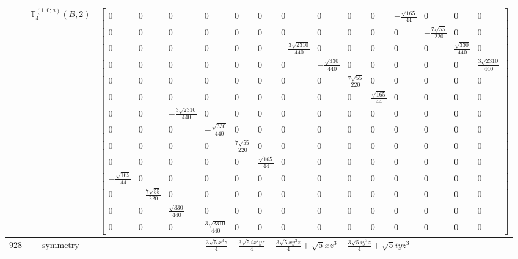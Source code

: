 \documentclass[fleqn,8pt,landscape]{jsarticle}
\begin{document}
\begin{longtable}{ccc}
$  $ & $ \mathbb{T}_{4}^{(1,0;a)}(B,2) $ & $ \begin{bmatrix} 0 & 0 & 0 & 0 & 0 & 0 & 0 & 0 & 0 & 0 & - \frac{\sqrt{165}}{44} & 0 & 0 & 0 \\ 0 & 0 & 0 & 0 & 0 & 0 & 0 & 0 & 0 & 0 & 0 & - \frac{7 \sqrt{55}}{220} & 0 & 0 \\ 0 & 0 & 0 & 0 & 0 & 0 & - \frac{3 \sqrt{2310}}{440} & 0 & 0 & 0 & 0 & 0 & \frac{\sqrt{330}}{440} & 0 \\ 0 & 0 & 0 & 0 & 0 & 0 & 0 & - \frac{\sqrt{330}}{440} & 0 & 0 & 0 & 0 & 0 & \frac{3 \sqrt{2310}}{440} \\ 0 & 0 & 0 & 0 & 0 & 0 & 0 & 0 & \frac{7 \sqrt{55}}{220} & 0 & 0 & 0 & 0 & 0 \\ 0 & 0 & 0 & 0 & 0 & 0 & 0 & 0 & 0 & \frac{\sqrt{165}}{44} & 0 & 0 & 0 & 0 \\ 0 & 0 & - \frac{3 \sqrt{2310}}{440} & 0 & 0 & 0 & 0 & 0 & 0 & 0 & 0 & 0 & 0 & 0 \\ 0 & 0 & 0 & - \frac{\sqrt{330}}{440} & 0 & 0 & 0 & 0 & 0 & 0 & 0 & 0 & 0 & 0 \\ 0 & 0 & 0 & 0 & \frac{7 \sqrt{55}}{220} & 0 & 0 & 0 & 0 & 0 & 0 & 0 & 0 & 0 \\ 0 & 0 & 0 & 0 & 0 & \frac{\sqrt{165}}{44} & 0 & 0 & 0 & 0 & 0 & 0 & 0 & 0 \\ - \frac{\sqrt{165}}{44} & 0 & 0 & 0 & 0 & 0 & 0 & 0 & 0 & 0 & 0 & 0 & 0 & 0 \\ 0 & - \frac{7 \sqrt{55}}{220} & 0 & 0 & 0 & 0 & 0 & 0 & 0 & 0 & 0 & 0 & 0 & 0 \\ 0 & 0 & \frac{\sqrt{330}}{440} & 0 & 0 & 0 & 0 & 0 & 0 & 0 & 0 & 0 & 0 & 0 \\ 0 & 0 & 0 & \frac{3 \sqrt{2310}}{440} & 0 & 0 & 0 & 0 & 0 & 0 & 0 & 0 & 0 & 0 \end{bmatrix} $ \\ \hline
$ 928 $ & $ \text{symmetry} $ & $ - \frac{3 \sqrt{5} x^{3} z}{4} - \frac{3 \sqrt{5} i x^{2} y z}{4} - \frac{3 \sqrt{5} x y^{2} z}{4} + \sqrt{5} x z^{3} - \frac{3 \sqrt{5} i y^{3} z}{4} + \sqrt{5} i y z^{3} $ \\

\end{longtable}
\end{document}
